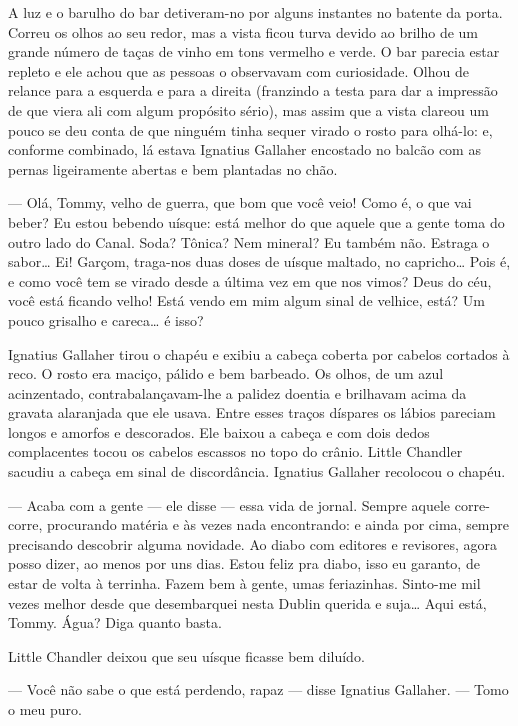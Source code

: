 A luz e o barulho do bar detiveram-no por alguns instantes no batente da porta.
Correu os olhos ao seu redor, mas a vista ficou turva devido ao brilho de um
grande número de taças de vinho em tons vermelho e verde.  O bar parecia estar
repleto e ele achou que as pessoas o observavam com curiosidade.  Olhou de
relance para a esquerda e para a direita (franzindo a testa para dar a
impressão de que viera ali com algum propósito sério), mas assim que a vista
clareou um pouco se deu conta de que ninguém tinha sequer virado o rosto para
olhá-lo: e, conforme combinado, lá estava Ignatius Gallaher encostado no balcão
com as pernas ligeiramente abertas e bem plantadas no chão.

--- Olá, Tommy, velho de guerra, que bom que você veio!  Como é, o que vai
beber? Eu estou bebendo uísque: está melhor do que aquele que a gente toma do
outro lado do Canal.  Soda?  Tônica?  Nem mineral?  Eu também não.  Estraga o
sabor\ldots{} Ei!  Garçom, traga-nos duas doses de uísque maltado, no
capricho\ldots{}  Pois é, e como você tem se virado desde a última vez em que
nos vimos?  Deus do céu, você está ficando velho!  Está vendo em mim algum
sinal de velhice, está?  Um pouco grisalho e careca\ldots{} é isso?

Ignatius Gallaher tirou o chapéu e exibiu a cabeça coberta por cabelos cortados
à reco.  O rosto era maciço, pálido e bem barbeado.  Os olhos, de um
azul acinzentado, contrabalançavam-lhe a palidez doentia e brilhavam acima da
gravata alaranjada que ele usava.  Entre esses traços díspares os lábios
pareciam longos e amorfos e descorados.  Ele baixou a cabeça e com dois dedos
complacentes tocou os cabelos escassos no topo do crânio.  Little Chandler
sacudiu a cabeça em sinal de discordância.  Ignatius Gallaher recolocou o
chapéu.

--- Acaba com a gente --- ele disse --- essa vida de jornal.  Sempre aquele
corre-corre, procurando matéria e às vezes nada encontrando: e ainda por cima,
sempre precisando descobrir alguma novidade.  Ao diabo com editores e
revisores, agora posso dizer, ao menos por uns dias.  Estou feliz pra diabo,
isso eu garanto, de estar de volta à terrinha.  Fazem bem à gente, umas
feriazinhas.  Sinto-me mil vezes melhor desde que desembarquei nesta Dublin
querida e suja\ldots{}  Aqui está, Tommy.  Água?  Diga quanto basta.

Little Chandler deixou que seu uísque ficasse bem diluído.

--- Você não sabe o que está perdendo, rapaz --- disse Ignatius Gallaher.  ---
Tomo o meu puro.

